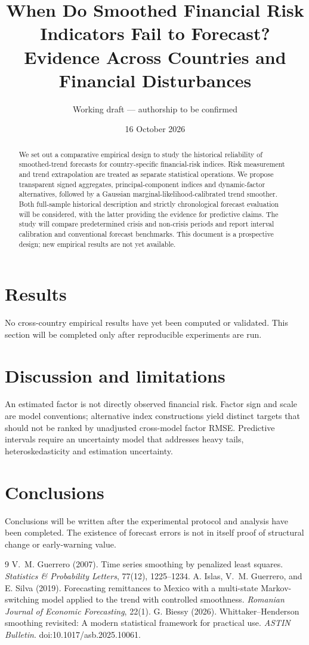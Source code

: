 \documentclass[11pt]{article}
\title{When Do Smoothed Financial Risk Indicators Fail to Forecast?\\
Evidence Across Countries and Financial Disturbances}
\author{Working draft --- authorship to be confirmed}
\date{16 October 2026}
\begin{document}
\maketitle
\begin{abstract}
We set out a comparative empirical design to study the historical reliability
of smoothed-trend forecasts for country-specific financial-risk indices.
Risk measurement and trend extrapolation are treated as separate statistical
operations. We propose transparent signed aggregates, principal-component
indices and dynamic-factor alternatives, followed by a Gaussian
marginal-likelihood-calibrated trend smoother. Both full-sample historical
description and strictly chronological forecast evaluation will be considered,
with the latter providing the evidence for predictive claims. The study will
compare predetermined crisis and non-crisis periods and report interval
calibration and conventional forecast benchmarks. This document is a
prospective design; new empirical results are not yet available.
\end{abstract}



\section{Results}
No cross-country empirical results have yet been computed or validated.
This section will be completed only after reproducible experiments are run.
\section{Discussion and limitations}
An estimated factor is not directly observed financial risk. Factor sign and
scale are model conventions; alternative index constructions yield distinct
targets that should not be ranked by unadjusted cross-model factor RMSE.
Predictive intervals require an uncertainty model that addresses heavy tails,
heteroskedasticity and estimation uncertainty.
\section{Conclusions}
Conclusions will be written after the experimental protocol and analysis have
been completed. The existence of forecast errors is not in itself proof of
structural change or early-warning value.
\begin{thebibliography}{9}
V.~M. Guerrero (2007).
Time series smoothing by penalized least squares.
\emph{Statistics \& Probability Letters}, 77(12), 1225--1234.
A. Islas, V.~M. Guerrero, and E. Silva (2019).
Forecasting remittances to Mexico with a multi-state Markov-switching model
applied to the trend with controlled smoothness.
\emph{Romanian Journal of Economic Forecasting}, 22(1).
G. Biessy (2026).
Whittaker--Henderson smoothing revisited: A modern statistical framework
for practical use.
\emph{ASTIN Bulletin}. doi:10.1017/asb.2025.10061.
\end{thebibliography}
\end{document}
